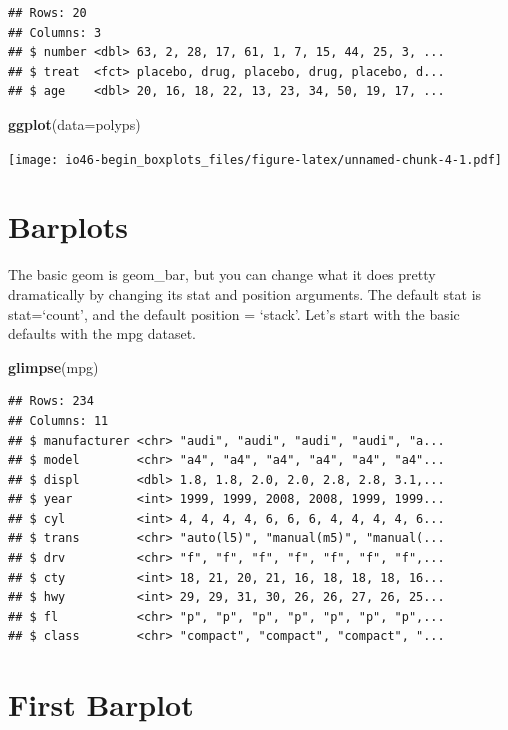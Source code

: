 \documentclass[
]{book}
\newenvironment{Shaded}{\begin{snugshade}}{\end{snugshade}}
\newcommand{\DataTypeTok}[1]{\textcolor[rgb]{0.13,0.29,0.53}{#1}}
\newcommand{\KeywordTok}[1]{\textcolor[rgb]{0.13,0.29,0.53}{\textbf{#1}}}
\newcommand{\NormalTok}[1]{#1}
\begin{document}
\begin{verbatim}
## Rows: 20
## Columns: 3
## $ number <dbl> 63, 2, 28, 17, 61, 1, 7, 15, 44, 25, 3, ...
## $ treat  <fct> placebo, drug, placebo, drug, placebo, d...
## $ age    <dbl> 20, 16, 18, 22, 13, 23, 34, 50, 19, 17, ...
\end{verbatim}

\begin{Shaded}
\begin{Highlighting}[]
\KeywordTok{ggplot}\NormalTok{(}\DataTypeTok{data=}\NormalTok{polyps)}
\end{Highlighting}
\end{Shaded}

\texttt{[image: io46-begin\_boxplots\_files/figure-latex/unnamed-chunk-4-1.pdf]}

\hypertarget{barplots}{%
\section{Barplots}\label{barplots}}

The basic geom is geom\_bar, but you can change what it does pretty dramatically by changing its stat and position arguments. The default stat is stat=`count', and the default position = `stack'.
Let's start with the basic defaults with the mpg dataset.

\begin{Shaded}
\begin{Highlighting}[]
\KeywordTok{glimpse}\NormalTok{(mpg)}
\end{Highlighting}
\end{Shaded}

\begin{verbatim}
## Rows: 234
## Columns: 11
## $ manufacturer <chr> "audi", "audi", "audi", "audi", "a...
## $ model        <chr> "a4", "a4", "a4", "a4", "a4", "a4"...
## $ displ        <dbl> 1.8, 1.8, 2.0, 2.0, 2.8, 2.8, 3.1,...
## $ year         <int> 1999, 1999, 2008, 2008, 1999, 1999...
## $ cyl          <int> 4, 4, 4, 4, 6, 6, 6, 4, 4, 4, 4, 6...
## $ trans        <chr> "auto(l5)", "manual(m5)", "manual(...
## $ drv          <chr> "f", "f", "f", "f", "f", "f", "f",...
## $ cty          <int> 18, 21, 20, 21, 16, 18, 18, 18, 16...
## $ hwy          <int> 29, 29, 31, 30, 26, 26, 27, 26, 25...
## $ fl           <chr> "p", "p", "p", "p", "p", "p", "p",...
## $ class        <chr> "compact", "compact", "compact", "...
\end{verbatim}

\hypertarget{first-barplot}{%
\section{First Barplot}\label{first-barplot}}
\end{document}

